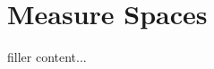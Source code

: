 \documentclass[../../templates/section]{subfiles}
\begin{document}
\section{Measure Spaces}\label{sec:measure-spaces}

filler content...
\end{document}
